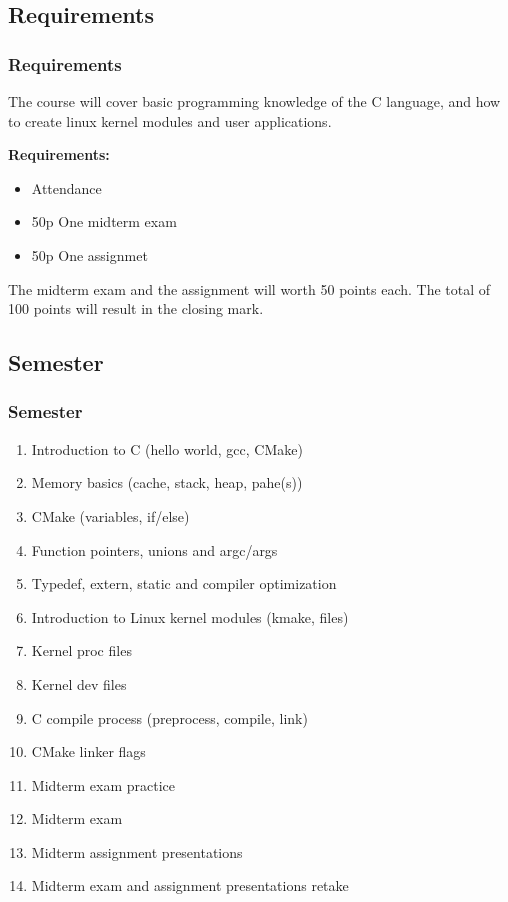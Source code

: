 \documentclass[
	11pt, %
]{beamer}
\begin{document}
\begin{frame}
    \subsection{Requirements}
	\frametitle{Requirements}

    The course will cover basic programming knowledge of the C language,
    and how to create linux kernel modules and user applications.

	\bigskip %

    \textbf{Requirements:}
	\begin{itemize}
		\item Attendance
		\item 50p One midterm exam
		\item 50p One assignmet
	\end{itemize}

	\bigskip %

    The midterm exam and the assignment will worth 50 points each.
    The total of 100 points will result in the closing mark.

\end{frame}

\begin{frame}
    \subsection{Semester}
	\frametitle{Semester}

	\begin{enumerate}
        \item Introduction to C (hello world, gcc, CMake)
        \item Memory basics (cache, stack, heap, pahe(s))
        \item CMake (variables, if/else)
        \item Function pointers, unions and argc/args
        \item Typedef, extern, static and compiler optimization
        \item Introduction to Linux kernel modules (kmake, files)
        \item Kernel proc files
        \item Kernel dev files
        \item C compile process (preprocess, compile, link)
        \item CMake linker flags
        \item Midterm exam practice
        \item Midterm exam
        \item Midterm assignment presentations
        \item Midterm exam and assignment presentations retake
	\end{enumerate}

\end{frame}
\end{document}
